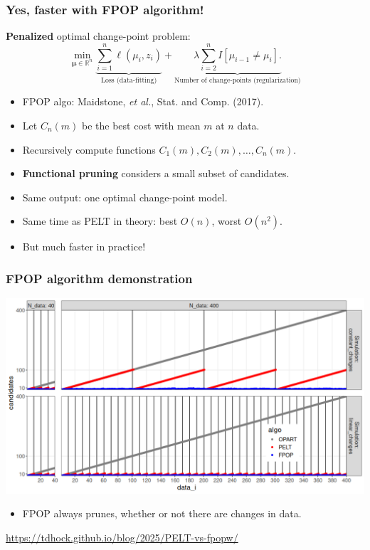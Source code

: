\documentclass{beamer}
\newcommand{\RR}{\mathbb R}
\begin{document}
\begin{frame}
  \frametitle{Yes, faster with FPOP algorithm!}
  \textbf{Penalized} optimal change-point problem:
$$
\min_{
  \mathbf \mu\in\RR^{n}
}
\underbrace{\sum_{i=1}^{n} \ell( \mu_i,  z_i)}_{\text{Loss (data-fitting)}} + \underbrace{\lambda\sum_{i=2}^n I[\mu_{i-1}\neq \mu_i].}_{\text{Number of change-points (regularization)}}
$$
\begin{itemize}
\item FPOP algo: Maidstone, \emph{et al.}, Stat. and Comp. (2017).
\item Let $C_n(m)$ be the best cost with mean $m$ at $n$ data.
\item Recursively compute functions $C_{1}(m), C_2(m),\dots, C_{n}(m)$.
\item \textbf{Functional pruning} considers a small subset of candidates.
\item Same output: one optimal change-point model.
\item Same time as PELT in theory: best $O(n)$, worst $O(n^2)$.
\item But much faster in practice!
\end{itemize}
\end{frame}



\begin{frame}
  \frametitle{FPOP algorithm demonstration}
  \includegraphics[width=\textwidth]{fpop-prune-1.png}

  \begin{itemize}
  \item FPOP always prunes, whether or not there are changes in data.
  \end{itemize}

  \url{https://tdhock.github.io/blog/2025/PELT-vs-fpopw/}
\end{frame}
 
\end{document}
